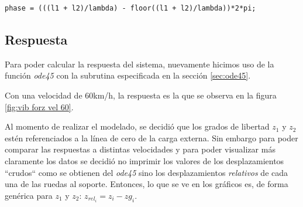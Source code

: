 \documentclass[oneside, a4paper, spanish, links]{amca}
\begin{document}
\begin{lstlisting}
phase = (((l1 + l2)/lambda) - floor((l1 + l2)/lambda))*2*pi;
\end{lstlisting}{}

\subsection{Respuesta}
\label{sec: resp a vib forz arm}

Para poder calcular la respuesta del sistema, nuevamente hicimos uso de la función \textit{ode45} con la subrutina especificada en la sección \ref{sec:ode45}. 

Con una velocidad de 60km/h, la respuesta es la que se observa en la figura \ref{fig:vib forz vel 60}. 

Al momento de realizar el modelado, se decidió que los grados de libertad \textit{$z_1$} y \textit{$z_2$} estén referenciados a la línea de cero de la carga externa. Sin embargo para poder comparar las respuestas a distintas velocidades y para poder visualizar más claramente los datos se decidió no imprimir los valores de los desplazamientos ``crudos`` como se obtienen del \textit{ode45} sino los desplazamientos \textit{relativos} de cada una de las ruedas al soporte. Entonces, lo que se ve en los gráficos es, de forma genérica para \textit{$z_1$} y \textit{$z_2$}: $z_{rel_i} = z_i - zg_i$.
\end{document}
